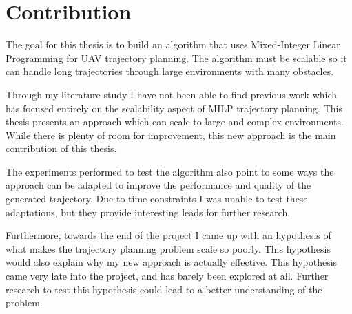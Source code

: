 \section{Contribution}
The goal for this thesis is to build an algorithm that uses Mixed-Integer Linear Programming for UAV trajectory planning. The algorithm must be scalable so it can handle long trajectories through large environments with many obstacles.
\par
Through my literature study I have not been able to find previous work which has focused entirely on the scalability aspect of MILP trajectory planning. This thesis presents an approach which can scale to large and complex environments. While there is plenty of room for improvement, this new approach is the main contribution of this thesis.
\par
The experiments performed to test the algorithm also point to some ways the approach can be adapted to improve the performance and quality of the generated trajectory. Due to time constraints I was unable to test these adaptations, but they provide interesting leads for further research.
\par
Furthermore, towards the end of the project I came up with an hypothesis of what makes the trajectory planning problem scale so poorly. This hypothesis would also explain why my new approach is actually effective. This hypothesis came very late into the project, and has barely been explored at all. Further research to test this hypothesis could lead to a better understanding of the problem.
